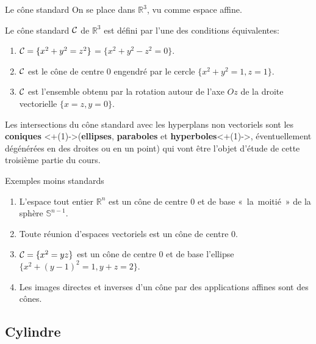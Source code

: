\documentclass[11pt]{m53beamer}
\begin{document}
\begin{frame}{Le cône standard}
  On se place dans $\mathbb{R}^{3}$, vu comme espace affine.
  \begin{defprop}
    \alert{Le cône standard} $\mathcal{C}$ de $\mathbb{R}^{3}$ est défini par l'une des conditions équivalentes:
    \begin{enumerate}[<+(1)->]
         \item $\mathcal{C}=\{x^{2}+y^{2}=z^{2}\}$\pause$=\{x^{2}+y^{2}-z^{2}=0\}$.
         \item $\mathcal{C}$ est le cône de centre $0$ engendré par le cercle $\{x^{2}+y^{2}=1, z=1\}$.
         \item $\mathcal{C}$ est l'ensemble obtenu par la rotation autour de l'axe $Oz$ de la droite vectorielle $\{x=z, y=0\}$.
       \end{enumerate}
  \end{defprop}\pause
  Les intersections du cône standard avec les hyperplans non vectoriels sont les \textbf{coniques} \uncover<+(1)->{(\textbf{ellipses}, \textbf{paraboles} et \textbf{hyperboles}\uncover<+(1)->{, éventuellement dégénérées en des droites ou en un point})} qui vont être l'objet d'étude de cette troisième partie du cours.
\end{frame}
\begin{frame}{Exemples moins standards}
  \begin{enumerate}[<+(1)->]
    \item L'espace tout entier $\mathbb{R}^{n}$ est un cône de centre $0$ et de base «~la~moitié~» de la sphère $\mathbb{S}^{n-1}$.
    \item Toute réunion d'espaces vectoriels est un cône de centre $0$.
    \item $\mathcal{C}=\{x^{2}=yz\}$ est un cône de centre $0$ et de base l'ellipse $\{x^{2}+(y-1)^{2}=1, y+z=2\}$.
    \item Les images directes et inverses d'un cône par des applications affines sont des cônes.
  \end{enumerate}
\end{frame}

\subsection{Cylindre}
\end{document}
